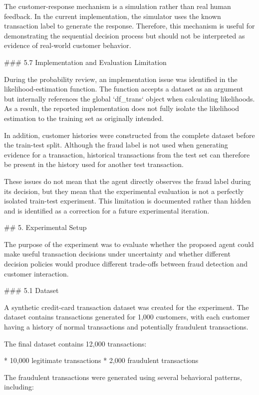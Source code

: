 The customer-response mechanism is a simulation rather than real human feedback. In the current implementation, the simulator uses the known transaction label to generate the response. Therefore, this mechanism is useful for demonstrating the sequential decision process but should not be interpreted as evidence of real-world customer behavior.

### 5.7 Implementation and Evaluation Limitation

During the probability review, an implementation issue was identified in the likelihood-estimation function. The function accepts a dataset as an argument but internally references the global `df_trans` object when calculating likelihoods. As a result, the reported implementation does not fully isolate the likelihood estimation to the training set as originally intended.

In addition, customer histories were constructed from the complete dataset before the train-test split. Although the fraud label is not used when generating evidence for a transaction, historical transactions from the test set can therefore be present in the history used for another test transaction.

These issues do not mean that the agent directly observes the fraud label during its decision, but they mean that the experimental evaluation is not a perfectly isolated train-test experiment. This limitation is documented rather than hidden and is identified as a correction for a future experimental iteration.

## 5. Experimental Setup

The purpose of the experiment was to evaluate whether the proposed agent could make useful transaction decisions under uncertainty and whether different decision policies would produce different trade-offs between fraud detection and customer interaction.

### 5.1 Dataset

A synthetic credit-card transaction dataset was created for the experiment. The dataset contains transactions generated for 1,000 customers, with each customer having a history of normal transactions and potentially fraudulent transactions.

The final dataset contains 12,000 transactions:

* 10,000 legitimate transactions
* 2,000 fraudulent transactions

The fraudulent transactions were generated using several behavioral patterns, including:

